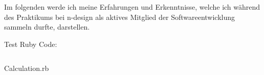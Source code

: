 \documentclass[11pt,a4paper,ngerman]{report}
\begin{document}
Im folgenden werde ich meine Erfahrungen und Erkenntnisse, welche ich während des Praktikums bei n-design als aktives Mitglied der Softwareentwicklung sammeln durfte, darstellen.

Test Ruby Code:
\begin{listing}
    \inputminted{ruby}{/Users/pbz/Documents/Projects/hasher_api/app/models/calculation.rb}
    \caption{Calculation.rb}
    \label{lst:Calculation}
\end{listing}
\end{document}
